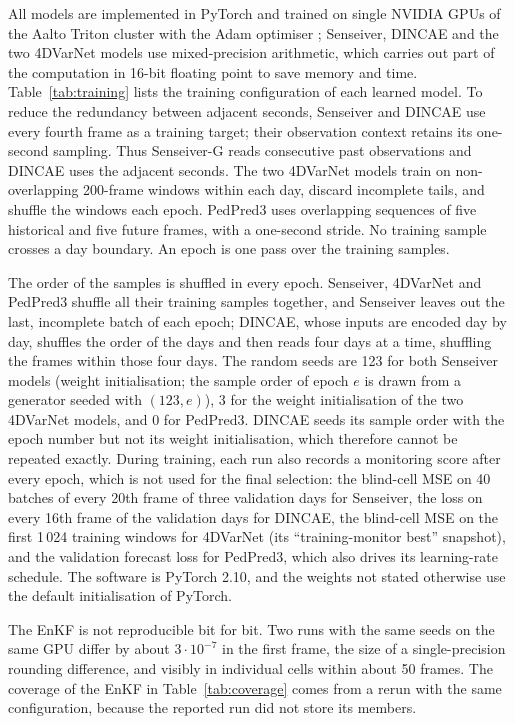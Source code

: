 \documentclass[english, 12pt, a4paper, elec, utf8, a-2b, online]{aaltothesis}
\begin{document}
All models are implemented in PyTorch and trained on single NVIDIA GPUs of the
Aalto Triton cluster with the Adam optimiser \cite{kingma2015adam}; Senseiver,
DINCAE and the two 4DVarNet models use mixed-precision arithmetic, which
carries out part of the computation in 16-bit floating point to save memory
and time. Table~\ref{tab:training}
lists the training configuration of each learned model. To reduce the
redundancy between adjacent seconds, Senseiver and DINCAE use every fourth
frame as a training target; their observation context retains its one-second
sampling. Thus Senseiver\nobreakdash-G reads consecutive past observations and DINCAE
uses the adjacent seconds. The two 4DVarNet models train on non-overlapping
200-frame windows within each day, discard incomplete tails, and shuffle the
windows each epoch. PedPred3 uses overlapping sequences of five historical
and five future frames, with a one-second stride. No training sample crosses
a day boundary. An epoch is one pass over the training samples.

The order of the samples is shuffled in every epoch. Senseiver, 4DVarNet and
PedPred3 shuffle all their training samples together, and Senseiver leaves out
the last, incomplete batch of each epoch; DINCAE, whose inputs are encoded day
by day, shuffles the order of the days and then reads four days at a time,
shuffling the frames within those four days.
The random seeds are 123 for both Senseiver models (weight initialisation; the
sample order of epoch $e$ is drawn from a generator seeded with $(123, e)$), 3
for the weight initialisation of the two 4DVarNet models, and 0 for PedPred3.
DINCAE seeds its sample order with the epoch number but not its weight
initialisation, which therefore cannot be repeated exactly. During training,
each run also records a monitoring score after every epoch, which is not used
for the final selection: the blind-cell MSE on 40 batches of every 20th frame
of three validation days for Senseiver, the loss on every 16th frame of the validation
days for DINCAE, the blind-cell MSE on the first 1\,024 training windows for
4DVarNet (its ``training-monitor best'' snapshot), and the validation forecast
loss for PedPred3, which also drives its learning-rate schedule. The software is
PyTorch 2.10, and the weights not stated otherwise use the default
initialisation of PyTorch.

The EnKF is not reproducible bit for bit. Two runs with the same seeds on the
same GPU differ by about $3 \cdot 10^{-7}$ in the first frame, the size of a
single-precision rounding difference, and visibly in individual cells within
about 50 frames. The coverage of the EnKF in Table~\ref{tab:coverage} comes from
a rerun with the same configuration, because the reported run did not store its
members.
\end{document}
